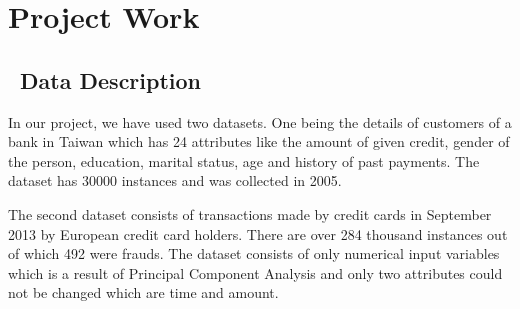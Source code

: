 \chapter{Project Work}\label{final}

\section{\ Data Description}
  \par In our project, we have used two datasets. One being the details of customers of a bank in Taiwan which has 24 attributes like the amount of given credit, gender of the person, education, marital status, age and history of past payments. The dataset has 30000 instances and was collected in 2005.~\cite{yeh2009comparisons}\par
  The second dataset consists of transactions made by credit cards in September 2013 by European credit card holders. There are over 284 thousand instances out of which 492 were frauds. The dataset consists of only numerical input variables which is a result of Principal Component Analysis and only two attributes could not be changed which are time and amount. ~\cite{dal2015calibrating}
